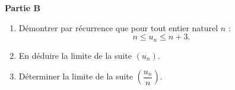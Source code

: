 \bigskip

\textbf{Partie B}

\medskip

\begin{enumerate}
\item Démontrer par récurrence que pour tout entier naturel $n$ :
\[n \leqslant u_n \leqslant n + 3.\]

\item En déduire la limite de la suite $\left(u_n\right)$.
\item Déterminer la limite de la suite $\left(\dfrac{u_n}{n}\right)$.
\end{enumerate}

\bigskip
